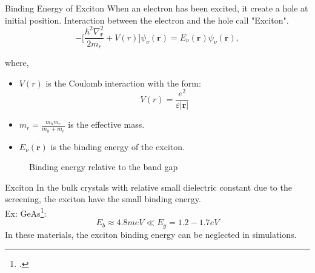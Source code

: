 \documentclass{beamer}
\begin{document}
\begin{frame}{Binding Energy of Exciton}
When an electron has been excited, it create a hole at initial position. Interaction between the electron and the hole call "Exciton".
	\begin{equation}
 -\bigg[\frac{\hbar^2\nabla^2_{\textbf{r}}}{2m_r} + V(r)\bigg]\psi_{\nu}(\textbf{r}) = E_{\nu}(\textbf{r})\psi_{\nu}(\textbf{r}),
	\end{equation}
	\begin{multicols}{2}
where,\\
\begin{itemize}
	\item $V(r)$ is the Coulomb interaction with the form:
	\begin{equation}
	\label{Vr}
		V(r) = \frac{e^2}{\varepsilon |\textbf{r}|}
	\end{equation}
	\item $m_r = \frac{m_hm_e}{m_h +m_e}$ is the effective mass.
	\item $E_\nu (\textbf{r})$ is the binding energy of the exciton.
	\vfill
\end{itemize}
		\columnbreak
\begin{figure}
	\caption{Binding energy relative to the band gap}
\end{figure}
	\end{multicols}
\end{frame}
\begin{frame}{Exciton}
\quad In the bulk crystals with relative small dielectric constant due to the screening, the exciton have the small binding energy.\\
Ex: GeAs\footcite{diakite2016accurateelectronictransportbulk}: $$E_b \approx 4.8 meV \ll E_g = 1.2-1.7 eV$$
\quad In these materials, the exciton binding energy can be neglected in simulations.
\end{frame}
\end{document}
